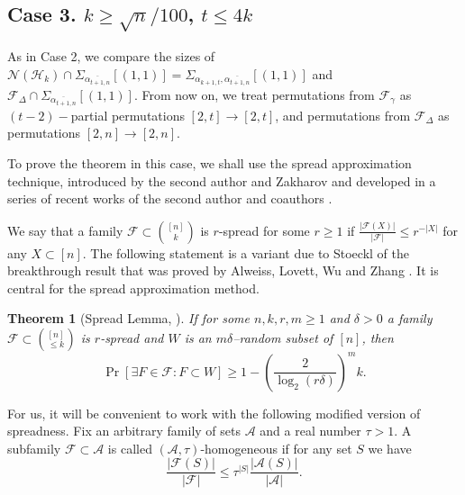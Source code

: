 \documentclass[11pt]{extarticle}
\numberwithin{equation}{section} %
\theoremstyle{plain}
\newtheorem{thm}{Theorem}
\theoremstyle{definition}
\newcommand{\FF}{\mathcal{F}}
\newcommand{\m}{\mathcal}
\newcommand{\HH}{\mathcal{H}}
\begin{document}
















\subsection{\textbf{Case 3.} $k\ge \sqrt n/100$, $t \leq 4k$}
As in Case 2, we compare the sizes of $\m{N}(\HH_k)\cap \Sigma_{\overline{\alpha_{t+1,n}}}[(1, 1)]=\Sigma_{\alpha_{k+1,t}, \overline{\alpha_{t+1,n}}}[(1, 1)]$ and $\FF_\Delta \cap \Sigma_{ \overline{\alpha_{t+1,n}}}[(1, 1)].$ 
From now on, we treat permutations from $\FF_{\gamma}$ as $(t-2)-$partial permutations $[2,t] \rightarrow [2,t]$, and permutations from $\FF_\Delta$ as permutations $[2, n] \rightarrow [2, n]$. 

To prove the theorem in this case, we shall use the spread approximation technique, introduced by the second author and Zakharov \cite{KuZa} and developed in a series of recent works of the second author and coauthors \cite{Kupavskii26,
Kupavskii24Perm,
FranklKup25,
IarKup25,
KupNos25}.

We say that a family $\FF \subset  {[n] \choose k}$ is $r$-spread for some $r\geq 1$ if $\frac{|\FF(X)|}{|\FF|} \leq r^{-|X|}$ for any $X \subset [n].$ The following statement is a variant due to Stoeckl \cite{St}   of  the breakthrough result that was proved  by Alweiss, Lovett, Wu and Zhang \cite{Alw}. It is central for the spread approximation method.

\begin{thm} [Spread Lemma, \cite{Alw}] \label{spreadtheorem}
    If for some $n, k, r, m \geq 1$ and $\delta>0$ a family $\FF \subset {[n] \choose \leq k}$ is $r$-spread and $W$ is an $ m\delta$--random subset of $[n]$, then 
    $$
        \Pr[\exists F \in \FF : F \subset W] \geq 1 - \left(\frac{2}{\log_2(r\delta)}\right )^m k.
    $$
\end{thm}

For us, it will be convenient to work with the following modified version of spreadness. Fix an
arbitrary family of sets $\m{A}$ and a real number $\tau>1$. A subfamily $\FF \subset \m{A}$ is called $(\m{A}, \tau)$-homogeneous if for any set $S$ we have 
$$
\frac{|\FF(S)|}{|\FF|}\leq \tau^{|S|}\frac{|\m{A}(S)|}{|\m{A}|}.
$$ 
\end{document}
